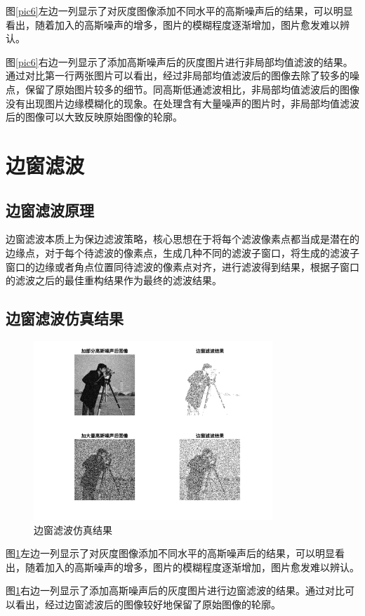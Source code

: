 \documentclass[conference]{IEEEtran}
\begin{document}
图\ref{pic6}左边一列显示了对灰度图像添加不同水平的高斯噪声后的结果，可以明显看出，随着加入的高斯噪声的增多，图片的模糊程度逐渐增加，图片愈发难以辨认。

图\ref{pic6}右边一列显示了添加高斯噪声后的灰度图片进行非局部均值滤波\cite{b5}的结果。通过对比第一行两张图片可以看出，经过非局部均值滤波后的图像去除了较多的噪点，保留了原始图片较多的细节。同高斯低通滤波相比，非局部均值滤波后的图像没有出现图片边缘模糊化的现象。在处理含有大量噪声的图片时，非局部均值滤波后的图像可以大致反映原始图像的轮廓。

\section{边窗滤波}
\subsection{边窗滤波原理}
边窗滤波\cite{b6}本质上为保边滤波策略，核心思想在于将每个滤波像素点都当成是潜在的边缘点，对于每个待滤波的像素点，生成几种不同的滤波子窗口，将生成的滤波子窗口的边缘或者角点位置同待滤波的像素点对齐，进行滤波得到结果，根据子窗口的滤波之后的最佳重构结果作为最终的滤波结果。

\subsection{边窗滤波仿真结果}
\begin{figure}[htbp]
	\centerline{
		\includegraphics[width=9cm]{SWBF滤波结果.png} 	
	}
	\caption{边窗滤波仿真结果}
	\label{pic7}
\end{figure}

图\ref{pic7}左边一列显示了对灰度图像添加不同水平的高斯噪声后的结果，可以明显看出，随着加入的高斯噪声的增多，图片的模糊程度逐渐增加，图片愈发难以辨认。

图\ref{pic7}右边一列显示了添加高斯噪声后的灰度图片进行边窗滤波的结果。通过对比可以看出，经过边窗滤波后的图像较好地保留了原始图像的轮廓。
\end{document}
